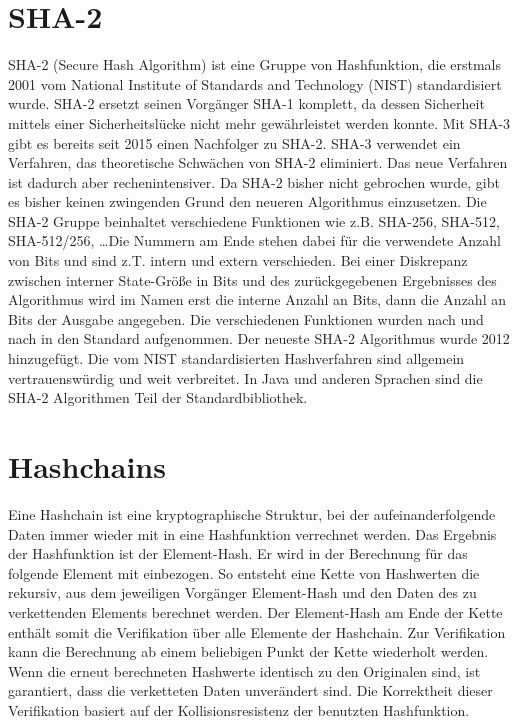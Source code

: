 \section{SHA-2}
\acs{SHA}-2 (Secure Hash Algorithm) ist eine Gruppe von Hashfunktion, die erstmals 2001 vom National Institute of Standards and Technology (NIST) standardisiert wurde. \acs{SHA}-2 ersetzt seinen Vorgänger \acs{SHA}-1 komplett, da dessen Sicherheit mittels einer Sicherheitslücke nicht mehr gewährleistet werden konnte. Mit \acs{SHA}-3 gibt es bereits seit 2015 einen Nachfolger zu \acs{SHA}-2. \acs{SHA}-3 verwendet ein Verfahren, das theoretische Schwächen von \acs{SHA}-2 eliminiert. Das neue Verfahren ist dadurch aber rechenintensiver. Da \acs{SHA}-2 bisher nicht gebrochen wurde, gibt es bisher keinen zwingenden Grund den neueren Algorithmus einzusetzen.
Die \acs{SHA}-2 Gruppe beinhaltet verschiedene Funktionen wie z.B. \acs{SHA}-256, \acs{SHA}-512, \acs{SHA}-512/256, \ldots Die Nummern am Ende stehen dabei für die verwendete Anzahl von Bits  und sind z.T. intern und extern verschieden. Bei einer Diskrepanz zwischen interner State-Größe in Bits und des zurückgegebenen Ergebnisses des Algorithmus wird im Namen erst die interne Anzahl an Bits, dann die Anzahl an Bits der Ausgabe angegeben. Die verschiedenen Funktionen wurden nach und nach in den Standard aufgenommen. Der neueste \acs{SHA}-2 Algorithmus wurde 2012 hinzugefügt.
Die vom NIST standardisierten Hashverfahren sind allgemein vertrauenswürdig und weit verbreitet. In Java und anderen Sprachen sind die \acs{SHA}-2 Algorithmen Teil der Standardbibliothek. \cite[S.82f]{1841202}

\section{Hashchains}
Eine Hashchain ist eine kryptographische Struktur, bei der aufeinanderfolgende Daten immer wieder mit in eine Hashfunktion verrechnet werden. Das Ergebnis der Hashfunktion ist der Element-Hash. Er wird in der Berechnung für das folgende Element mit einbezogen. So entsteht eine Kette von Hashwerten die rekursiv, aus dem jeweiligen Vorgänger Element-Hash und den Daten des zu verkettenden Elements berechnet werden. Der Element-Hash am Ende der Kette enthält somit die Verifikation über alle Elemente der Hashchain. Zur Verifikation kann die Berechnung ab einem beliebigen Punkt der Kette wiederholt werden. Wenn die erneut berechneten Hashwerte identisch zu den Originalen sind, ist garantiert, dass die verketteten Daten unverändert sind. Die Korrektheit dieser Verifikation basiert auf der Kollisionsresistenz der benutzten Hashfunktion.\cite[S.351ff]{40322788}

